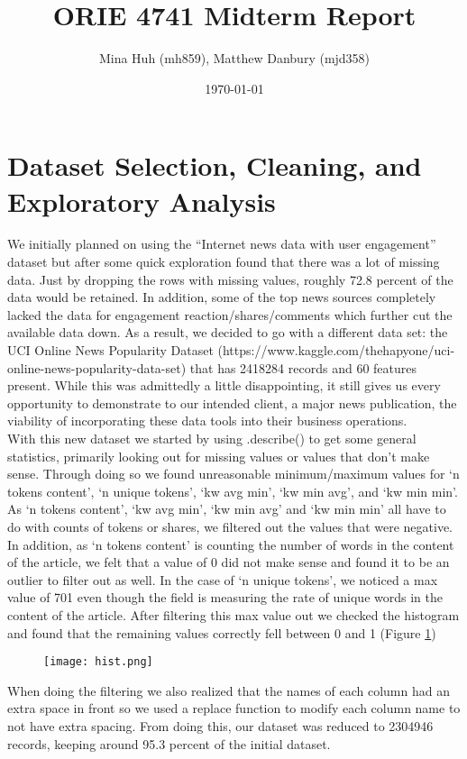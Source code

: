 \documentclass{article}
\title{ORIE 4741 Midterm Report}
\author{Mina Huh (mh859), Matthew Danbury (mjd358) }
\date{\today}
\begin{document}
\maketitle

\section{Dataset Selection, Cleaning, and Exploratory Analysis}

We initially planned on using the “Internet news data with user engagement” dataset but after some quick exploration found that there was a lot of missing data. Just by dropping the rows with missing values, roughly 72.8 percent of the data would be retained. In addition, some of the top news sources completely lacked the data for engagement reaction/shares/comments which further cut the available data down. As a result, we decided to go with a different data set: the UCI Online News Popularity Dataset (https://www.kaggle.com/thehapyone/uci-online-news-popularity-data-set) that has 2418284 records and 60 features present. While this was admittedly a little disappointing, it still gives us every opportunity to demonstrate to our intended client, a major news publication, the viability of incorporating these data tools into their business operations.\\

With this new dataset we started by using .describe() to get some general statistics, primarily looking out for missing values or values that don’t make sense. Through doing so we found unreasonable minimum/maximum values for ‘n tokens content’, ‘n unique tokens’, ‘kw avg min’, ‘kw min avg’, and ‘kw min min’. As ‘n tokens content’, ‘kw avg min’, ‘kw min avg’ and ‘kw min min’ all have to do with counts of tokens or shares, we filtered out the values that were negative. In addition, as ‘n tokens content’ is counting the number of words in the content of the article, we felt that a value of 0 did not make sense and found it to be an outlier to filter out as well. In the case of ‘n unique tokens’, we noticed a max value of 701 even though the field is measuring the rate of unique words in the content of the article. After filtering this max value out we checked the histogram and found that the remaining values correctly fell between 0 and 1 (Figure \ref{fig:hist})
\begin{figure}[h!]
    \centering
    \texttt{[image: hist.png]}
    \caption{}
    \label{fig:hist}
\end{figure}
When doing the filtering we also realized that the names of each column had an extra space in front so we used a replace function to modify each column name to not have extra spacing. From doing this, our dataset was reduced to 2304946 records, keeping around 95.3 percent of the initial dataset. \\
\end{document}
